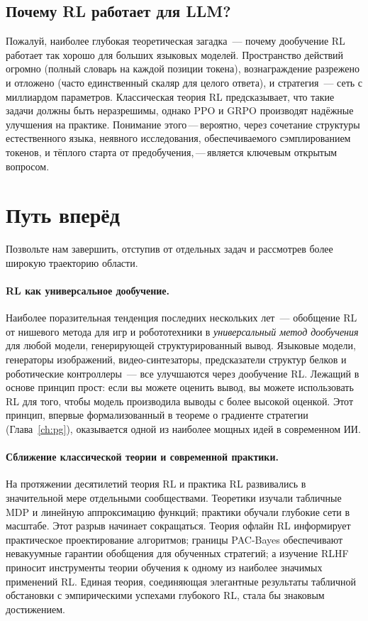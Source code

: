 \subsection{Почему RL работает для LLM?}

Пожалуй, наиболее глубокая теоретическая загадка~--- почему дообучение RL работает
так хорошо для больших языковых моделей. Пространство действий огромно
(полный словарь на каждой позиции токена), вознаграждение
разрежено и отложено (часто единственный скаляр для целого ответа), и
стратегия~--- сеть с миллиардом параметров. Классическая теория RL
предсказывает, что такие задачи должны быть неразрешимы, однако PPO и GRPO
производят надёжные улучшения на практике. Понимание
этого\,---\,вероятно, через сочетание структуры естественного
языка, неявного исследования, обеспечиваемого сэмплированием токенов, и
тёплого старта от предобучения,\,---\,является ключевым открытым вопросом.


\section{Путь вперёд}
\label{sec:open-road}

Позвольте нам завершить, отступив от отдельных задач и рассмотрев
более широкую траекторию области.

\paragraph{RL как универсальное дообучение.}
Наиболее поразительная тенденция последних нескольких лет~--- обобщение RL
от нишевого метода для игр и робототехники
в \emph{универсальный метод дообучения} для любой модели, генерирующей
структурированный вывод. Языковые модели, генераторы изображений, видео-синтезаторы,
предсказатели структур белков и роботические контроллеры~---
все улучшаются через дообучение RL. Лежащий в основе
принцип прост: если вы можете оценить вывод, вы можете использовать RL для
того, чтобы модель производила выводы с более высокой оценкой. Этот принцип, впервые
формализованный в теореме о градиенте стратегии (Глава~\ref{ch:pg}),
оказывается одной из наиболее мощных идей в современном ИИ.

\paragraph{Сближение классической теории и современной практики.}
На протяжении десятилетий теория RL и практика RL развивались в
значительной мере отдельными сообществами. Теоретики изучали табличные MDP и линейную аппроксимацию
функций; практики обучали глубокие сети в масштабе.
Этот разрыв начинает сокращаться. Теория офлайн RL информирует практическое
проектирование алгоритмов; границы PAC-Bayes обеспечивают невакуумные гарантии обобщения
для обученных стратегий; а изучение RLHF приносит
инструменты теории обучения к одному из наиболее значимых
применений RL. Единая теория, соединяющая элегантные
результаты табличной обстановки с эмпирическими успехами глубокого RL,
стала бы знаковым достижением.

